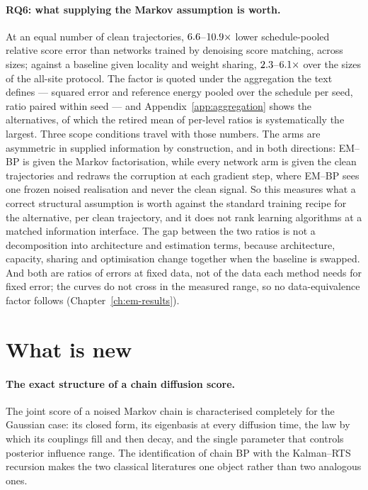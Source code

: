 \paragraph{RQ6: what supplying the Markov assumption is worth.} At an equal
number of clean trajectories, $6.6$--$10.9\times$ lower
schedule-pooled relative
score error than networks
trained by denoising score matching, across \nsizesused{} sizes; against a
baseline given locality and weight sharing,
$2.3$--$6.1\times$ over the \structsizes{} sizes of the
all-site protocol.
The factor is quoted under the aggregation the text defines --- squared error
and reference energy pooled over the schedule per seed, ratio paired within
seed --- and Appendix~\ref{app:aggregation} shows the alternatives, of which
the retired mean of per-level ratios is systematically the largest.
Three scope conditions travel with those numbers. The arms are asymmetric in
supplied information by construction, and in both directions: EM--BP is given
the Markov factorisation, while every network arm is given the clean
trajectories and redraws the corruption at each gradient step, where EM--BP
sees one frozen noised realisation and never the clean signal. So this
measures what a correct structural assumption is worth against the standard
training recipe for the alternative, per clean trajectory, and it does not
rank learning algorithms at a matched information interface. The gap between the two ratios is not a decomposition into
architecture and estimation terms, because architecture, capacity, sharing and
optimisation change together when the baseline is swapped. And both are ratios
of errors at fixed data, not of the data each method needs for fixed error; the
curves do not cross in the measured range, so no data-equivalence factor follows
(Chapter~\ref{ch:em-results}).

\section{What is new}

\paragraph{The exact structure of a chain diffusion score.} The joint score of a
noised Markov chain is characterised completely for the Gaussian case: its
closed form, its eigenbasis at every diffusion time, the law by which its
couplings fill and then decay, and the single parameter that controls posterior
influence range. The identification of chain BP with the Kalman--RTS recursion
makes the two classical literatures one object rather than two analogous ones.

